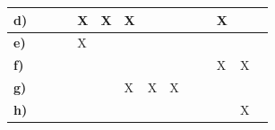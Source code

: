 \documentclass[]{politex-xico}
\begin{document}
\begin{table}[ht]
{\begin{tabular}{l|llll|llll|llll|l|}
\multicolumn{1}{|l|}{\textbf{d)}}         & \multicolumn{1}{l|}{}                  & \multicolumn{1}{l|}{}                  & \multicolumn{1}{l|}{}                  & X                 & \multicolumn{1}{l|}{X}                 & \multicolumn{1}{l|}{X}                 & \multicolumn{1}{l|}{}                  &                   & \multicolumn{1}{l|}{}                  & \multicolumn{1}{l|}{}                  & \multicolumn{1}{l|}{X}                  &                   &                   \\ \hline
\multicolumn{1}{|l|}{\textbf{e)}}         & \multicolumn{1}{l|}{}                  & \multicolumn{1}{l|}{}                  & \multicolumn{1}{l|}{}                  & X                 & \multicolumn{1}{l|}{}                  & \multicolumn{1}{l|}{}                  & \multicolumn{1}{l|}{}                  &                   & \multicolumn{1}{l|}{}                  & \multicolumn{1}{l|}{}                  & \multicolumn{1}{l|}{}                  &                   &                   \\ \hline
\multicolumn{1}{|l|}{\textbf{f)}}         & \multicolumn{1}{l|}{}                  & \multicolumn{1}{l|}{}                  & \multicolumn{1}{l|}{}                  &                   & \multicolumn{1}{l|}{}                  & \multicolumn{1}{l|}{}                  & \multicolumn{1}{l|}{}                 &                   & \multicolumn{1}{l|}{}                  & \multicolumn{1}{l|}{}                  & \multicolumn{1}{l|}{X}                  &     \multicolumn{1}{l|}{X}                 &                   \\ \hline
\multicolumn{1}{|l|}{\textbf{g)}}         & \multicolumn{1}{l|}{}                  & \multicolumn{1}{l|}{}                  & \multicolumn{1}{l|}{}                  &                   & \multicolumn{1}{l|}{}                  & \multicolumn{1}{l|}{X}                  & \multicolumn{1}{l|}{X}                 & X                 & \multicolumn{1}{l|}{}                 & \multicolumn{1}{l|}{}                  & \multicolumn{1}{l|}{}                  &                   &                   \\ \hline
\multicolumn{1}{|l|}{\textbf{h)}}         & \multicolumn{1}{l|}{}                  & \multicolumn{1}{l|}{}                  & \multicolumn{1}{l|}{}                  &                   & \multicolumn{1}{l|}{}                  & \multicolumn{1}{l|}{}                  & \multicolumn{1}{l|}{}                  &                   & \multicolumn{1}{l|}{}                 & \multicolumn{1}{l|}{}                  & \multicolumn{1}{l|}{}                  &  \multicolumn{1}{l|}{X}                    &                   \\ \hline

\end{tabular}}
\end{table}
\end{document}
